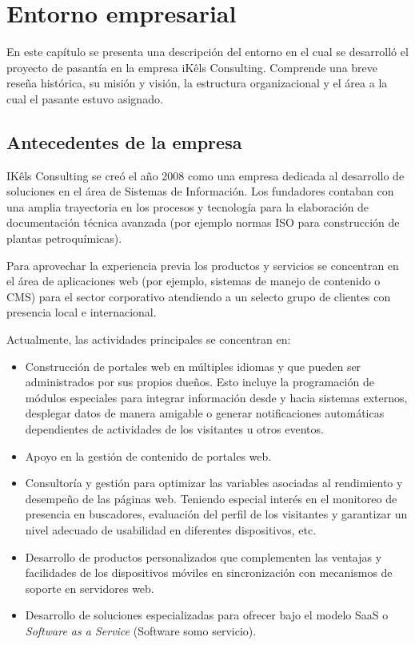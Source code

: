\chapter{Entorno empresarial}
En este capítulo se presenta una descripción del entorno en el cual se desarrolló el proyecto de pasantía en la empresa iKêls Consulting. Comprende una breve reseña histórica, su misión y visión, la estructura organizacional y el área a la cual el pasante estuvo asignado.

\section{Antecedentes de la empresa}
IKêls Consulting se creó el año 2008 como una empresa dedicada al desarrollo de soluciones en el área de Sistemas de Información. Los fundadores contaban con una amplia trayectoria en los procesos y tecnología para la elaboración de documentación técnica avanzada (por ejemplo normas ISO para construcción de plantas petroquímicas).

Para aprovechar la experiencia previa los productos y servicios se concentran en el área de aplicaciones web (por ejemplo, sistemas de manejo de contenido o CMS) para el sector corporativo atendiendo a un selecto grupo de clientes con presencia local e internacional.

Actualmente, las actividades principales se concentran en:

\begin{itemize}
  \item Construcción de portales web en múltiples idiomas y que pueden ser administrados por sus propios dueños. Esto incluye la programación de módulos especiales para integrar información desde y hacia sistemas externos, desplegar datos de manera amigable o generar notificaciones automáticas dependientes de actividades de los visitantes u otros eventos.
  \item Apoyo en la gestión de contenido de portales web.
  \item Consultoría y gestión para optimizar las variables asociadas al rendimiento y desempeño de las páginas web. Teniendo especial interés en el monitoreo de presencia en buscadores, evaluación del perfil de los visitantes y garantizar un nivel adecuado de usabilidad en diferentes dispositivos, etc.
  \item Desarrollo de productos personalizados que complementen las ventajas y facilidades de los dispositivos móviles en sincronización con mecanismos de soporte en servidores web.
  \item Desarrollo de soluciones especializadas para ofrecer bajo el modelo SaaS o \textit{Software as a Service} (Software somo servicio).
\end{itemize}

